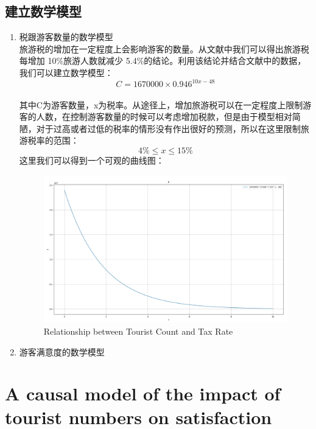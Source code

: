 \documentclass[12pt]{article}  %
\begin{document}
 \subsection{建立数学模型}
 \begin{enumerate}[(1)]
    \setlength{\parsep}{0ex} %
\setlength{\topsep}{2ex} %
\setlength{\itemsep}{1ex} %
\item 税跟游客数量的数学模型\\
旅游税的增加在一定程度上会影响游客的数量。从文献\cite{taxandtour}中我们可以得出旅游税每增加 10\%旅游人数就减少 5.4\%的结论。利用该结论并结合文献\cite{pop}中的数据，我们可以建立数学模型：\\
$$C=1670000 \times 0.946^{10x-48}$$\\
其中C为游客数量，x为税率。从途径上，增加旅游税可以在一定程度上限制游客的人数，在控制游客数量的时候可以考虑增加税款，但是由于模型相对简陋，对于过高或者过低的税率的情形没有作出很好的预测，所以在这里限制旅游税率的范围：$$4\% \leq x  \leq 15\%$$
这里我们可以得到一个可观的曲线图：
\begin{figure}[htbp]  %
 
    \centering  %
    \includegraphics[width=1\textwidth]{model1.png} %
    \caption{Relationship between Tourist Count and Tax Rate} %
    \label{fig1}%
    \end{figure}
\item 游客满意度的数学模型\\



\end{enumerate}
 \section{A causal model of the impact of tourist numbers on satisfaction}
\end{document}
